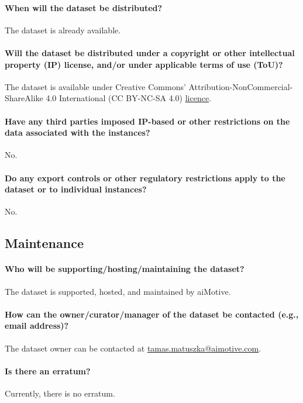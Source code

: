 \documentclass{article}
\begin{document}
\paragraph{When will the dataset be distributed?} The dataset is already available.

\paragraph{Will the dataset be distributed under a copyright or other intellectual property (IP) license, and/or under applicable terms of use (ToU)?} The dataset is available under Creative Commons' Attribution-NonCommercial-ShareAlike 4.0 International (CC BY-NC-SA 4.0) \href{https://creativecommons.org/licenses/by-nc-sa/4.0/}{licence}.

\paragraph{Have any third parties imposed IP-based or other restrictions on the data associated with the instances?} No.

\paragraph{Do any export controls or other regulatory restrictions apply to the dataset or to individual instances?} No.


\subsection{Maintenance}
\paragraph{Who will be supporting/hosting/maintaining the dataset?} The dataset is supported, hosted, and maintained by aiMotive.

\paragraph{How can the owner/curator/manager of the dataset be contacted (e.g., email address)?} The dataset owner can be contacted at \href{mailto:tamas.matuszka@aimotive.com}{tamas.matuszka@aimotive.com}.

\paragraph{Is there an erratum?} Currently, there is no erratum.
\end{document}
